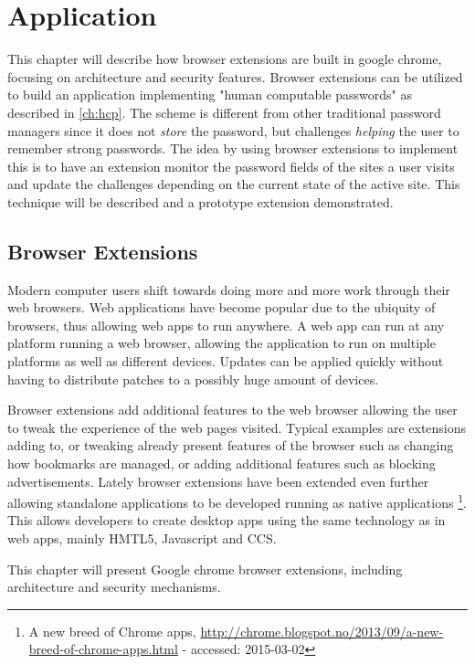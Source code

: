 \chapter{Application}\label{app}
This chapter will describe how browser extensions are built in google chrome, focusing on architecture and security features. Browser extensions can be utilized to build an application implementing "human computable passwords" as described in \autoref{ch:hcp}. The scheme is different from other traditional password managers since it does not \emph{store} the password, but challenges \emph{helping} the user to remember strong passwords. The idea by using browser extensions to implement this is to have an extension monitor the password fields of the sites a user visits and update the challenges depending on the current state of the active site. This technique will be described and a prototype extension demonstrated. 
\section{Browser Extensions}\label{browser-extensions}
Modern computer users shift towards doing more and more work through their web browsers. Web applications have become popular due to the ubiquity of browsers, thus allowing web apps to run anywhere. A web app can run at any platform running a web browser, allowing the application to run on multiple platforms as well as different devices. Updates can be applied quickly without having to distribute patches to a possibly huge amount of devices.
\par Browser extensions add additional features to the web browser allowing the user to tweak the experience of the web pages visited. Typical examples are extensions adding to, or tweaking already present features of the browser such as changing how bookmarks are managed, or adding additional features such as blocking advertisements. Lately browser extensions have been extended even further allowing standalone applications to be developed running as native applications \footnote{A new breed of Chrome apps, \url{http://chrome.blogspot.no/2013/09/a-new-breed-of-chrome-apps.html} - accessed: 2015-03-02}. This allows developers to create desktop apps using the same technology as in web apps, mainly HMTL5, Javascript and CCS.
\par This chapter will present Google chrome browser extensions, including architecture and security mechanisms.


